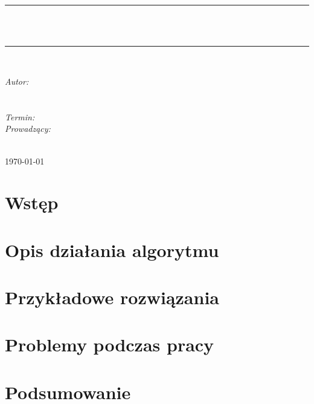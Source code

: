 \documentclass[10pt, a4paper]{article}
\begin{document}
\def\tablename{Tabela}	%
\begin{titlepage}
	\begin{center}
		\textsc{\LARGE \formakursu}\\[1cm]		
		\textsc{\Large \kurs}\\[0.5cm]		
		\rule{\textwidth}{0.08cm}\\[1cm]
		{\huge \bfseries \doctype}\\[1cm]
		\rule{\textwidth}{0.08cm}\\[1cm]
		\begin{flushright} \large
		\emph{Autor: }\\
		\osobaA\\
		\osobaB\\[0.4cm]
		\emph{Termin: }\termin\\[0.4cm]
		\emph{Prowadzący:} \\
		\prowadzacy \\
		\end{flushright}
		\vfill
		{\large \today}
	\end{center}	
\end{titlepage}
\newpage
\tableofcontents
\newpage

\section{Wstęp}
\label{sec:Wstep}
\begin{figure}[htbp]
	\centering
	\label{fig:nazwa}
\end{figure}

\section{Opis działania algorytmu}
\label{sec:opis}

\section{Przykładowe rozwiązania}
\label{sec:przyklady}

\section{Problemy podczas pracy}
\label{sec:problemy}

\section{Podsumowanie}
\label{sec:Podsumowanie}

\newpage



\end{document}
